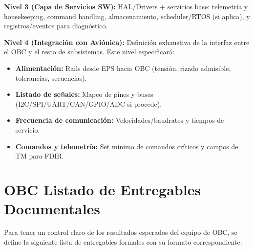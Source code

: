 \textbf{Nivel 3 (Capa de Servicios SW):} HAL/Drivers + servicios base: telemetría y housekeeping, command handling, almacenamiento, scheduler/RTOS (si aplica), y registros/eventos para diagnóstico.

\textbf{Nivel 4 (Integración con Aviónica):} Definición exhaustiva de la interfaz entre el OBC y el resto de subsistemas. Este nivel especificará:
\begin{itemize}
  \item \textbf{Alimentación:} Rails desde EPS hacia OBC (tensión, rizado admisible, tolerancias, secuencias).
  \item \textbf{Listado de señales:} Mapeo de pines y buses (I2C/SPI/UART/CAN/GPIO/ADC si procede).
  \item \textbf{Frecuencia de comunicación:} Velocidades/baudrates y tiempos de servicio.
  \item \textbf{Comandos y telemetría:} Set mínimo de comandos críticos y campos de TM para FDIR.
\end{itemize}

\chapter{OBC Listado de Entregables Documentales}

Para tener un control claro de los resultados esperados del equipo de OBC, se define la siguiente lista de entregables formales con su formato correspondiente:


